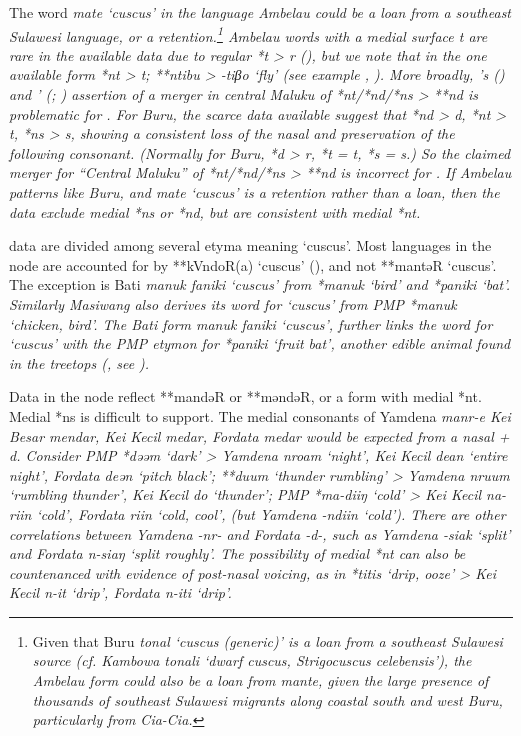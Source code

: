 The word \it{mate} ‘cuscus’ in the  language Ambelau
could be a loan from a southeast Sulawesi language,
or a retention.\footnote{
Given that Buru \it{tonal} ‘cuscus (generic)’
is a loan from a southeast Sulawesi source (cf.
Kambowa \it{tonali} ‘dwarf cuscus,
\it{Strigocuscus celebensis}’), the Ambelau form could also be
a loan from \it{mante},
given the large presence of thousands of southeast Sulawesi migrants
along coastal south and west Buru, particularly from Cia-Cia.}
Ambelau words with
a medial surface \it{t} are rare in the available data due to
regular *t > \it{r} (),
but we note that in the one available form *nt > \it{t}; **ntibu
> \it{-tiβo} ‘fly’ (see example , ).
More broadly, \citeauthor{Stresemann1927}’s (\citeyear[41]{Stresemann1927})
and \citeauthor{Collins1981}’ (\citeyear[36]{Collins1981}; \citeyear[55]{Collins1983}) assertion of a merger in central
Maluku of *nt/*nd/*ns > **nd is problematic for .
For Buru, the scarce data available suggest that *nd > \it{d},
*nt > \it{t}, *ns > \it{s},
showing a consistent loss of the nasal
and preservation of the following consonant.
(Normally for Buru, *d > \it{r},
*t = \it{t}, *s = \it{s}.) So the claimed merger for “Central
Maluku” of *nt/*nd/*ns > **nd is incorrect for .
If Ambelau patterns like Buru,
and \it{mate} ‘cuscus’ is a retention rather than a loan,
then the  data exclude medial *ns or *nd,
but are consistent with medial *nt.

 data are divided among several etyma meaning ‘cuscus’.
Most languages in the  node are accounted for
by **kVndoR(a) ‘cuscus’ (),
and not **mantəR ‘cuscus’.
The exception is Bati \it{manuk faniki} `cuscus' from *manuk `bird' and *paniki `bat'.
Similarly  Masiwang also derives
its word for ‘cuscus’ from PMP *manuk ‘chicken, bird’.
The Bati form \it{manuk faniki} ‘cuscus’,
further links the word for ‘cuscus’ with the PMP etymon for
*paniki ‘fruit bat’, another edible animal found in the treetops
(\citealp[269f]{Schapper2011}, see ).

Data in the  node reflect **mandəR or
**məndəR, or a form with medial *nt.
Medial *ns is difficult to support.
The medial consonants of Yamdena \it{manr-e} Kei Besar \it{mendar},
Kei Kecil \it{medar}, Fordata \it{medar} would be expected from
a nasal + \it{d}.
Consider PMP *dəəm ‘dark’ > Yamdena \it{nroam}
‘night’, Kei Kecil \it{dean} ‘entire night’,
Fordata \it{deən} ‘pitch black’; **duum ‘thunder
rumbling’ > Yamdena \it{nruum} ‘rumbling thunder’,
Kei Kecil \it{do} ‘thunder’; PMP *ma-diiŋ ‘cold’
> Kei Kecil \it{na-riin} ‘cold’,
Fordata \it{riin} ‘cold, cool’,
(but Yamdena \it{-ndiin} ‘cold’).
There are other correlations between Yamdena \mbox{\it{-nr-}}
and Fordata \it{-d-}, such as Yamdena \it{-siak} ‘split’
and Fordata \it{n-siaŋ} ‘split roughly’.
The possibility of medial *nt can also be countenanced with evidence
of post-nasal voicing, as in *titis ‘drip,
ooze’ > Kei Kecil \it{n-it} ‘drip’, Fordata \it{n-iti} ‘drip’.

